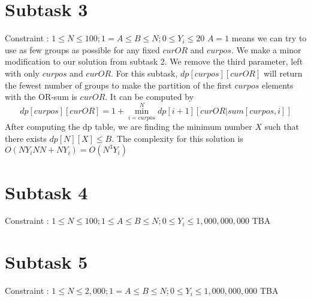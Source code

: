 \documentclass[a4paper,11pt]{article}
\begin{document}
\section{Subtask 3}
Constraint : $1\leq N \leq 100; 1 = A \leq B \leq N; 0 \leq Y_i \leq 20$\newline
$A = 1$ means we can try to use as few groups as possible for any fixed $curOR$ and $curpos$. We make a minor modification to our solution from subtask 2. We remove the third parameter, left with only $curpos$ and $curOR$. For this subtask, $dp[curpos][curOR]$ will return the fewest number of groups to make the partition of the first $curpos$ elements with the OR-sum is $curOR$. It can be computed by
\[dp[curpos][curOR] = 1 + \min_{i=curpos}^{N}dp[i+1][curOR | sum[curpos,i]] \]
After computing the dp table, we are finding the minimum number $X$ such that there exists $dp[N][X] \leq B$. The complexity for this solution is $O(NY_iNN + NY_i) = O(N^3Y_i)$

\section{Subtask 4}
Constraint : $1\leq N \leq 100; 1 \leq A \leq B \leq N; 0 \leq Y_i \leq 1,000,000,000$\newline
TBA

\section{Subtask 5}
Constraint : $1\leq N \leq 2,000; 1 = A \leq B \leq N; 0 \leq Y_i \leq 1,000,000,000$\newline
TBA
\end{document}

